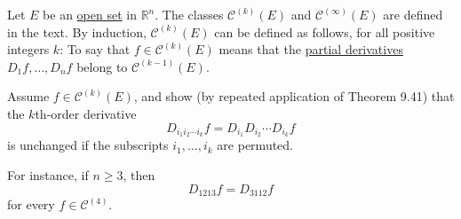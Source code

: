 	\begin{exercise}[Rudin 9.29]
		Let $E$ be an \hyperref[pst-def:open-set]{open set} in $\mathbb{R}^n$. The classes $\mathscr{C}^{(k)}(E)$ and $\mathscr{C}^{(\infty)}(E)$ are defined in the text. By induction, $\mathscr{C}^{(k)}(E)$ can be defined as follows, for all positive integers $k$: To say that $f\in\mathscr{C}^{(k)}(E)$ means that the \hyperref[def:partial-derivative]{partial derivatives} $D_1f,\ldots,D_nf$ belong to $\mathscr{C}^{(k-1)}(E)$.

		Assume $f\in\mathscr{C}^{(k)}(E)$, and show (by repeated application of Theorem 9.41) that the $k$th-order derivative
		\begin{equation}
			D_{i_1i_2\cdots i_k}f
			=
			D_{i_1}D_{i_2}\cdots D_{i_k}f
		\end{equation}
		is unchanged if the subscripts $i_1,\ldots,i_k$ are permuted.

		For instance, if $n\geq3$, then
		\begin{equation}
			D_{1213}f=D_{3112}f
		\end{equation}
		for every $f\in\mathscr{C}^{(4)}$.
	\end{exercise}

